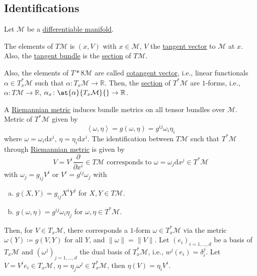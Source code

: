 \subsection{Identifications}
Let \(\mathcal{M} \) be a \hyperref[def:smooth-manifold]{differentiable manifold}.

\begin{prev}
	The elements of \(T \mathcal{M} \) is \((x, V)\) with \(x\in \mathcal{M} \), \(V\) the \hyperref[def:tangent-vector]{tangent vector} to \(\mathcal{M} \) at \(x\). Also, the \hyperref[def:tangent-bundle]{tangent bundle} is the \hyperref[def:section]{section} of \(T \mathcal{M} \).

	Also, the elements of \(T*8\mathcal{M} \) are called \hyperref[def:cotangent-vector]{cotangent vector}, i.e., linear functionals \(\alpha \in T_x ^{\ast} \mathcal{M} \) such that \(\alpha \colon T_x \mathcal{M} \to \mathbb{R} \). Then, the \hyperref[def:section]{section} of \(T^{\ast} \mathcal{M} \) are \(1\)-forms, i.e., \(\alpha \colon T \mathcal{M} \to \mathbb{R} \), \(\alpha _x \colon \at{\alpha }{T_x \mathcal{M} }{} \to \mathbb{R} \).
\end{prev}

A \hyperref[def:Riemannian-metric]{Riemannian metric} induces bundle metrics on all tensor bundles over \(\mathcal{M} \). Metric of \(T^{\ast} \mathcal{M} \) given by
\[
	\left\langle \omega , \eta \right\rangle = g(\omega , \eta ) = g^{ij} \omega _i \eta _i
\]
where \(\omega = \omega _i \mathrm{d} x^i\), \(\eta = \eta _i \mathrm{d} x^i\). The identification between \(T\mathcal{M} \) such that \(T^{\ast} \mathcal{M} \) through \hyperref[def:Riemannian-metric]{Riemannian metric} is given by
\[
	V = V^i \frac{\partial }{\partial x^i} \in T \mathcal{M} \text{ corresponds to } \omega = \omega _j \mathrm{d} x^j \in T^{\ast} \mathcal{M}
\]
with \(\omega _j = g_{ij} V^i\) or \(V^i = g^{ij} \omega _j\) with
\begin{enumerate}[(a)]
	\item \(g(X, Y) = g_{ij}X^i Y^j \) for \(X, Y\in T \mathcal{M} \).
	\item \(g(\omega , \eta ) = g^{ij} \omega _i \eta _j\) for \(\omega , \eta \in T^{\ast} \mathcal{M} \).
\end{enumerate}

Then, for \(V\in T_x \mathcal{M} \), there corresponds a \(1\)-form \(\omega \in T_x ^{\ast} \mathcal{M} \) via the metric \(\omega (Y) \coloneqq g(V, Y)\) for all \(Y\), and \(\lVert \omega \rVert = \lVert V \rVert \). Let \((e_i)_{i=1, \ldots , d}\) be a basis of \(T_x \mathcal{M} \) and \((\omega ^j)_{j=1, \ldots , d}\) the dual basis of \(T_x ^{\ast} \mathcal{M} \), i.e., \(w^j(e_i)=\delta _i^j\). Let \(V = V^i e_i \in T_x \mathcal{M} \), \(\eta =\eta _j \omega ^j \in T_x^{\ast} \mathcal{M} \), then \(\eta (V) = \eta _i V^i\).

